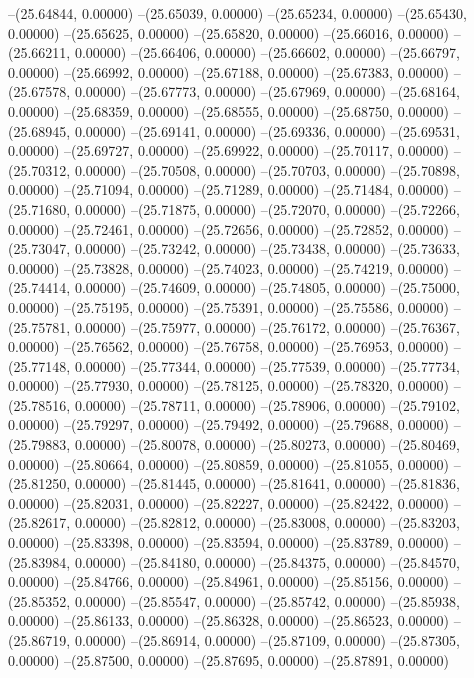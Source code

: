 --(25.64844, 0.00000)
--(25.65039, 0.00000)
--(25.65234, 0.00000)
--(25.65430, 0.00000)
--(25.65625, 0.00000)
--(25.65820, 0.00000)
--(25.66016, 0.00000)
--(25.66211, 0.00000)
--(25.66406, 0.00000)
--(25.66602, 0.00000)
--(25.66797, 0.00000)
--(25.66992, 0.00000)
--(25.67188, 0.00000)
--(25.67383, 0.00000)
--(25.67578, 0.00000)
--(25.67773, 0.00000)
--(25.67969, 0.00000)
--(25.68164, 0.00000)
--(25.68359, 0.00000)
--(25.68555, 0.00000)
--(25.68750, 0.00000)
--(25.68945, 0.00000)
--(25.69141, 0.00000)
--(25.69336, 0.00000)
--(25.69531, 0.00000)
--(25.69727, 0.00000)
--(25.69922, 0.00000)
--(25.70117, 0.00000)
--(25.70312, 0.00000)
--(25.70508, 0.00000)
--(25.70703, 0.00000)
--(25.70898, 0.00000)
--(25.71094, 0.00000)
--(25.71289, 0.00000)
--(25.71484, 0.00000)
--(25.71680, 0.00000)
--(25.71875, 0.00000)
--(25.72070, 0.00000)
--(25.72266, 0.00000)
--(25.72461, 0.00000)
--(25.72656, 0.00000)
--(25.72852, 0.00000)
--(25.73047, 0.00000)
--(25.73242, 0.00000)
--(25.73438, 0.00000)
--(25.73633, 0.00000)
--(25.73828, 0.00000)
--(25.74023, 0.00000)
--(25.74219, 0.00000)
--(25.74414, 0.00000)
--(25.74609, 0.00000)
--(25.74805, 0.00000)
--(25.75000, 0.00000)
--(25.75195, 0.00000)
--(25.75391, 0.00000)
--(25.75586, 0.00000)
--(25.75781, 0.00000)
--(25.75977, 0.00000)
--(25.76172, 0.00000)
--(25.76367, 0.00000)
--(25.76562, 0.00000)
--(25.76758, 0.00000)
--(25.76953, 0.00000)
--(25.77148, 0.00000)
--(25.77344, 0.00000)
--(25.77539, 0.00000)
--(25.77734, 0.00000)
--(25.77930, 0.00000)
--(25.78125, 0.00000)
--(25.78320, 0.00000)
--(25.78516, 0.00000)
--(25.78711, 0.00000)
--(25.78906, 0.00000)
--(25.79102, 0.00000)
--(25.79297, 0.00000)
--(25.79492, 0.00000)
--(25.79688, 0.00000)
--(25.79883, 0.00000)
--(25.80078, 0.00000)
--(25.80273, 0.00000)
--(25.80469, 0.00000)
--(25.80664, 0.00000)
--(25.80859, 0.00000)
--(25.81055, 0.00000)
--(25.81250, 0.00000)
--(25.81445, 0.00000)
--(25.81641, 0.00000)
--(25.81836, 0.00000)
--(25.82031, 0.00000)
--(25.82227, 0.00000)
--(25.82422, 0.00000)
--(25.82617, 0.00000)
--(25.82812, 0.00000)
--(25.83008, 0.00000)
--(25.83203, 0.00000)
--(25.83398, 0.00000)
--(25.83594, 0.00000)
--(25.83789, 0.00000)
--(25.83984, 0.00000)
--(25.84180, 0.00000)
--(25.84375, 0.00000)
--(25.84570, 0.00000)
--(25.84766, 0.00000)
--(25.84961, 0.00000)
--(25.85156, 0.00000)
--(25.85352, 0.00000)
--(25.85547, 0.00000)
--(25.85742, 0.00000)
--(25.85938, 0.00000)
--(25.86133, 0.00000)
--(25.86328, 0.00000)
--(25.86523, 0.00000)
--(25.86719, 0.00000)
--(25.86914, 0.00000)
--(25.87109, 0.00000)
--(25.87305, 0.00000)
--(25.87500, 0.00000)
--(25.87695, 0.00000)
--(25.87891, 0.00000)
